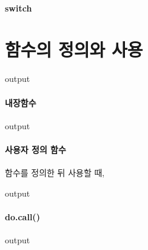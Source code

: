 \documentclass{report}
\begin{document}
\paragraph{switch}
\begin{Schunk}
\begin{Soutput}

\end{Soutput}
\end{Schunk}

\section{함수의 정의와 사용}
\begin{Schunk}
\begin{Soutput}
output
\end{Soutput}
\end{Schunk}

\paragraph{내장함수}
\begin{Schunk}
\begin{Soutput}
output
\end{Soutput}
\end{Schunk}



\paragraph{사용자 정의 함수}

함수를 정의한 뒤 사용할 때, 
\begin{Schunk}
\begin{Soutput}
output
\end{Soutput}
\end{Schunk}

\paragraph{do.call()}
\begin{Schunk}
\begin{Soutput}
output
\end{Soutput}
\end{Schunk}
\end{document}
